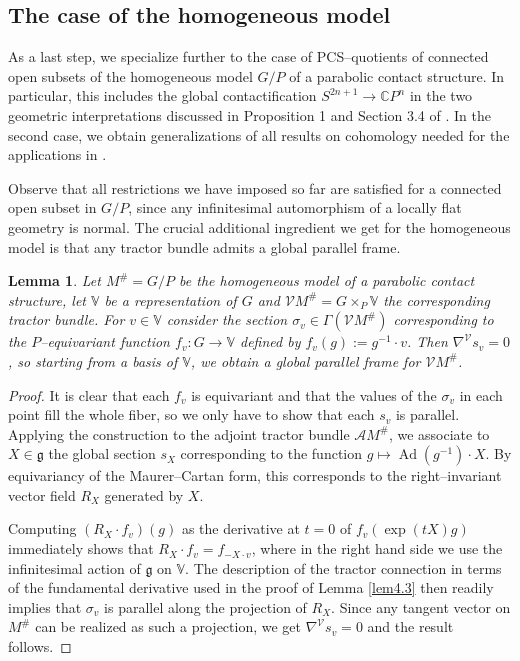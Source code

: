 \documentclass[12pt,a4paper]{amsart}
\def\frak{\mathfrak}
\def\Bbb{\mathbb}
\def\Cal{\mathcal}
\newcommand{\x}{\times}
\newcommand{\si}{\sigma}
\newcommand{\Ga}{\Gamma}
\newcommand{\Ad}{\operatorname{Ad}}
\newcounter{theorem}
\numberwithin{theorem}{section}
\newtheorem{lemma}[theorem]{Lemma}
\theoremstyle{definition}
\theoremstyle{remark}
\begin{document}
\subsection{The case of the homogeneous model}\label{4.5} 
As a last step, we specialize further to the case of PCS--quotients
of connected open subsets of the homogeneous model $G/P$ of a
parabolic contact structure. In particular, this includes the global
contactification $S^{2n+1}\to\Bbb CP^n$ in the two geometric
interpretations discussed in Proposition 1 and Section 3.4 of
\cite{PCS2}. In the second case, we obtain generalizations of all
results on cohomology needed for the applications in \cite{E-G}.

Observe that all restrictions we have imposed so far are satisfied for
a connected open subset in $G/P$, since any infinitesimal automorphism
of a locally flat geometry is normal. The crucial additional
ingredient we get for the homogeneous model is that any tractor bundle
admits a global parallel frame.

\begin{lemma}\label{lem4.5}
  Let $M^\#=G/P$ be the homogeneous model of a parabolic contact
  structure, let $\Bbb V$ be a representation of $G$ and $\Cal
  VM^\#=G\x_P\Bbb V$ the corresponding tractor bundle. For $v\in\Bbb
  V$ consider the section $\si_v\in\Ga(\Cal VM^\#)$ corresponding to
  the $P$--equivariant function $f_v:G\to\Bbb V$ defined by
  $f_v(g):=g^{-1}\cdot v$. Then $\nabla^{\Cal V}s_v=0$, so starting
  from a basis of $\Bbb V$, we obtain a global parallel frame for
  $\Cal VM^\#$.
\end{lemma}
\begin{proof}
  It is clear that each $f_v$ is equivariant and that the values of
  the $\si_v$ in each point fill the whole fiber, so we only have to
  show that each $s_v$ is parallel. Applying the construction to the
  adjoint tractor bundle $\Cal AM^\#$, we associate to $X\in\frak g$
  the global section $s_X$ corresponding to the function $g\mapsto
  \Ad(g^{-1})\cdot X$. By equivariancy of the Maurer--Cartan form,
  this corresponds to the right--invariant vector field $R_X$
  generated by $X$. 

  Computing $(R_X\cdot f_v)(g)$ as the derivative at $t=0$ of
  $f_v(\exp(tX)g)$ immediately shows that $R_X\cdot f_v=f_{-X\cdot
    v}$, where in the right hand side we use the infinitesimal action
  of $\frak g$ on $\Bbb V$. The description of the tractor connection
  in terms of the fundamental derivative used in the proof of Lemma
  \ref{lem4.3} then readily implies that $\si_v$ is parallel along the
  projection of $R_X$. Since any tangent vector on $M^\#$ can be
  realized as such a projection, we get $\nabla^{\Cal V}s_v=0$ and the
  result follows.
\end{proof}
\end{document}
